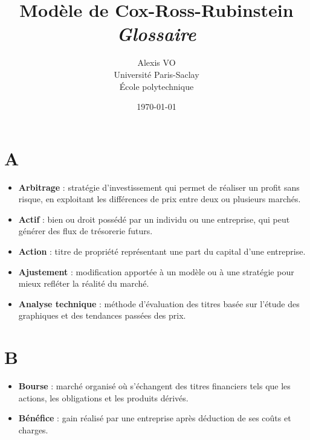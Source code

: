 \documentclass[a4paper,10pt]{article}
\title{\Huge{\textbf{Modèle de Cox-Ross-Rubinstein}}\\ \medskip
      \Huge{\textit{Glossaire}}\vspace*{0.7cm}}
\author{\LARGE{Alexis VO}\vspace{1cm}\\ \medskip
      Université Paris-Saclay\\École polytechnique}
\date{\vspace{0.2cm}\today}
\begin{document}
\vspace{\fill}
  \maketitle
\vspace{\fill}

\newpage

\tableofcontents

\newpage

\begin{multicols}{2}

\section*{A}
\begin{itemize}
  \item \textbf{Arbitrage} : stratégie d’investissement qui permet de réaliser un profit sans risque, en exploitant les différences de prix entre deux ou plusieurs marchés.
  \item \textbf{Actif} : bien ou droit possédé par un individu ou une entreprise, qui peut générer des flux de trésorerie futurs.
  \item \textbf{Action} : titre de propriété représentant une part du capital d’une entreprise.
  \item \textbf{Ajustement} : modification apportée à un modèle ou à une stratégie pour mieux refléter la réalité du marché.
  \item \textbf{Analyse technique} : méthode d’évaluation des titres basée sur l’étude des graphiques et des tendances passées des prix.
\end{itemize}

\section*{B}
\begin{itemize}
  \item \textbf{Bourse} : marché organisé où s’échangent des titres financiers tels que les actions, les obligations et les produits dérivés.
  \item \textbf{Bénéfice} : gain réalisé par une entreprise après déduction de ses coûts et charges.
\end{itemize}


\end{multicols}
\end{document}
